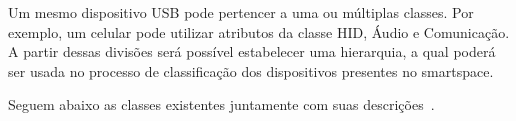 Um mesmo dispositivo USB pode pertencer a uma ou múltiplas classes. Por exemplo, um celular pode utilizar atributos da classe HID, Áudio e Comunicação. A partir dessas divisões será possível estabelecer uma hierarquia, a qual poderá ser usada no processo de classificação dos dispositivos presentes no smartspace.

Seguem abaixo as classes existentes juntamente com suas descrições~\cite{usbclasscodes}.

\begin{comment}
\begin{table}
	\caption{Exemplos de classes de dispositivos USB~\cite{usbclasscodes}.}
	\begin{center}
		\begin{tabular}{cccc}
		\hline
		\multicolumn{4}{c}{\textbf{Classes de Dispositivos}}													\\
		\hline
		Audio					&	Comunicação				&	Interface Humana (HID)	&	Físico 				\\
		\hline
		Imagem					&	Impressora				&	Disco Rígido			&	Hub 				\\
		\hline
		\emph{Smart Card}		&	Segurança de Conteúdo	&	Vídeo					&	Saúde Pessoal 		\\
		\hline
		Diagnóstico				&	Controlador Wireless	&	Diversos				&	Aplicação Específica\\
		\hline
		Fabricante Específico	&							&							&						\\
		\hline
		\end{tabular}
	\end{center}
	\label{tab:dispositivos_usb}
\end{table}
\end{comment}

